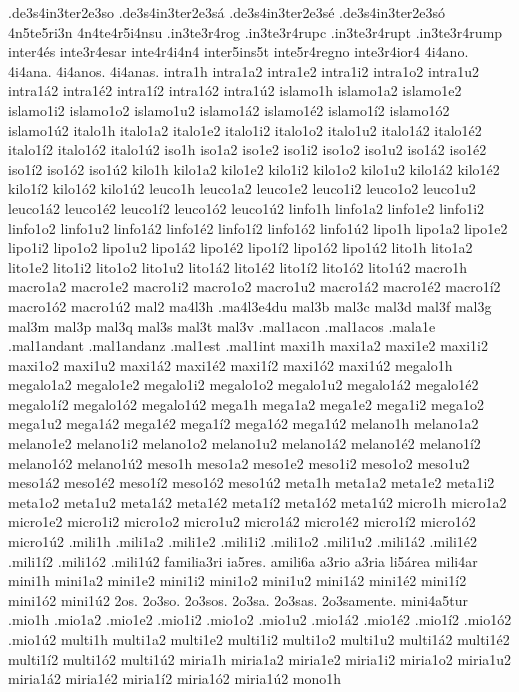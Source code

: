 {.de3s4in3ter2e3so
.de3s4in3ter2e3sá
.de3s4in3ter2e3sé
.de3s4in3ter2e3só
4n5te5ri3n
4n4te4r5i4nsu
.in3te3r4rog
.in3te3r4rupc
.in3te3r4rupt
.in3te3r4rump
inter4és
inte3r4esar
inte4r4i4n4
inter5ins5t
inte5r4regno
inte3r4ior4
4i4ano.
4i4ana.
4i4anos.
4i4anas.
intra1h
intra1a2 intra1e2 intra1i2 intra1o2 intra1u2
intra1á2 intra1é2 intra1í2 intra1ó2 intra1ú2
islamo1h
islamo1a2 islamo1e2 islamo1i2 islamo1o2 islamo1u2
islamo1á2 islamo1é2 islamo1í2 islamo1ó2 islamo1ú2
italo1h
italo1a2 italo1e2 italo1i2 italo1o2 italo1u2
italo1á2 italo1é2 italo1í2 italo1ó2 italo1ú2
iso1h
iso1a2 iso1e2 iso1i2 iso1o2 iso1u2
iso1á2 iso1é2 iso1í2 iso1ó2 iso1ú2
kilo1h
kilo1a2 kilo1e2 kilo1i2 kilo1o2 kilo1u2
kilo1á2 kilo1é2 kilo1í2 kilo1ó2 kilo1ú2
leuco1h
leuco1a2 leuco1e2 leuco1i2 leuco1o2 leuco1u2
leuco1á2 leuco1é2 leuco1í2 leuco1ó2 leuco1ú2
linfo1h
linfo1a2 linfo1e2 linfo1i2 linfo1o2 linfo1u2
linfo1á2 linfo1é2 linfo1í2 linfo1ó2 linfo1ú2
lipo1h
lipo1a2 lipo1e2 lipo1i2 lipo1o2 lipo1u2
lipo1á2 lipo1é2 lipo1í2 lipo1ó2 lipo1ú2
lito1h
lito1a2 lito1e2 lito1i2 lito1o2 lito1u2
lito1á2 lito1é2 lito1í2 lito1ó2 lito1ú2
macro1h
macro1a2 macro1e2 macro1i2 macro1o2 macro1u2
macro1á2 macro1é2 macro1í2 macro1ó2 macro1ú2
mal2
ma4l3h
.ma4l3e4du
mal3b
mal3c
mal3d
mal3f
mal3g
mal3m
mal3p
mal3q
mal3s
mal3t
mal3v
.mal1acon
.mal1acos
.mala1e
.mal1andant
.mal1andanz
.mal1est
.mal1int
maxi1h
maxi1a2 maxi1e2 maxi1i2 maxi1o2 maxi1u2
maxi1á2 maxi1é2 maxi1í2 maxi1ó2 maxi1ú2
megalo1h
megalo1a2 megalo1e2 megalo1i2 megalo1o2 megalo1u2
megalo1á2 megalo1é2 megalo1í2 megalo1ó2 megalo1ú2
mega1h
mega1a2 mega1e2 mega1i2 mega1o2 mega1u2
mega1á2 mega1é2 mega1í2 mega1ó2 mega1ú2
melano1h
melano1a2 melano1e2 melano1i2 melano1o2 melano1u2
melano1á2 melano1é2 melano1í2 melano1ó2 melano1ú2
meso1h
meso1a2 meso1e2 meso1i2 meso1o2 meso1u2
meso1á2 meso1é2 meso1í2 meso1ó2 meso1ú2
meta1h
meta1a2 meta1e2 meta1i2 meta1o2 meta1u2
meta1á2 meta1é2 meta1í2 meta1ó2 meta1ú2
micro1h
micro1a2 micro1e2 micro1i2 micro1o2 micro1u2
micro1á2 micro1é2 micro1í2 micro1ó2 micro1ú2
.mili1h
.mili1a2 .mili1e2 .mili1i2 .mili1o2 .mili1u2
.mili1á2 .mili1é2 .mili1í2 .mili1ó2 .mili1ú2
familia3ri
ia5res.
amili6a
a3rio
a3ria
li5área
mili4ar
mini1h
mini1a2 mini1e2 mini1i2 mini1o2 mini1u2
mini1á2 mini1é2 mini1í2 mini1ó2 mini1ú2
2os.
2o3so.
2o3sos.
2o3sa.
2o3sas.
2o3samente.
mini4a5tur
.mio1h
.mio1a2 .mio1e2 .mio1i2 .mio1o2 .mio1u2
.mio1á2 .mio1é2 .mio1í2 .mio1ó2 .mio1ú2
multi1h
multi1a2 multi1e2 multi1i2 multi1o2 multi1u2
multi1á2 multi1é2 multi1í2 multi1ó2 multi1ú2
miria1h
miria1a2 miria1e2 miria1i2 miria1o2 miria1u2
miria1á2 miria1é2 miria1í2 miria1ó2 miria1ú2
mono1h
}
